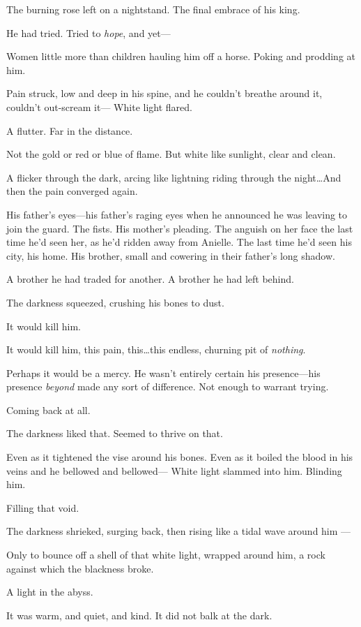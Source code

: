 The burning rose left on a nightstand.
The final embrace of his king.

He had tried.
Tried to \emph{hope}, and yet---

Women little more than children hauling him off a horse.
Poking and prodding at him.

Pain struck, low and deep in his spine, and he couldn't breathe around it, couldn't out-scream it--- White light flared.

A flutter.
Far in the distance.

Not the gold or red or blue of flame.
But white like sunlight, clear and clean.

A flicker through the dark, arcing like lightning riding through the night\ldots And then the pain converged again.

His father's eyes---his father's raging eyes when he announced he was leaving to join the guard.
The fists.
His mother's pleading.
The anguish on her face the last time he'd seen her, as he'd ridden away from Anielle.
The last time he'd seen his city, his home.
His brother, small and cowering in their father's long shadow.

A brother he had traded for another.
A brother he had left behind.

The darkness squeezed, crushing his bones to dust.

It would kill him.

It would kill him, this pain, this\ldots this endless, churning pit of \emph{nothing}.

Perhaps it would be a mercy.
He wasn't entirely certain his presence---his presence \emph{beyond} made any sort of difference.
Not enough to warrant trying.

Coming back at all.

The darkness liked that.
Seemed to thrive on that.

Even as it tightened the vise around his bones.
Even as it boiled the blood in his veins and he bellowed and bellowed--- White light slammed into him.
Blinding him.

Filling that void.

The darkness shrieked, surging back, then rising like a tidal wave around him ---

Only to bounce off a shell of that white light, wrapped around him, a rock against which the blackness broke.

A light in the abyss.

It was warm, and quiet, and kind.
It did not balk at the dark.


